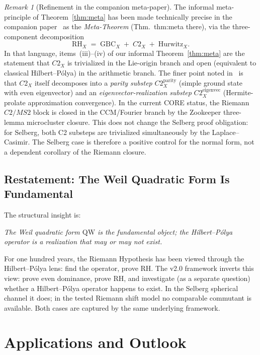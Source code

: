 \documentclass[12pt,a4paper]{article}
\theoremstyle{definition}
\theoremstyle{remark}
\newtheorem{remark}[theorem]{Remark}
\newcommand{\QW}{\mathrm{QW}}
\begin{document}
\begin{remark}[Refinement in the companion meta-paper]
\label{rem:meta-paper-refinement}
The informal meta-principle of Theorem~\ref{thm:meta} has been made
technically precise in the companion paper~\cite{GeigerMeta2026} as the
\emph{Meta-Theorem} (Thm.~thm:meta there), via the three-component
decomposition
\[
\mathrm{RH}_X \;=\; \mathrm{GBC}_X \;+\; C2_X \;+\; \mathrm{Hurwitz}_X.
\]
In that language, items~(iii)--(iv) of our informal Theorem~\ref{thm:meta}
are the statement that $C2_X$ is trivialized in the Lie-origin branch and
open (equivalent to classical Hilbert--Pólya) in the arithmetic branch.
The finer point noted in~\cite{GeigerMeta2026}
is that $C2_X$ itself decomposes into a \emph{parity substep}
$C2_X^{\mathrm{parity}}$ (simple ground state with even eigenvector) and an
\emph{eigenvector-realization substep} $C2_X^{\mathrm{eigenvec}}$
(Hermite-prolate approximation convergence). In the current CORE status,
the Riemann $C2/MS2$ block is closed in the CCM/Fourier branch by the
Zookeeper three-lemma microcluster closure.  This does not change the
Selberg proof obligation: for Selberg, both C2 substeps are trivialized
simultaneously by the Laplace--Casimir.  The Selberg case is therefore a
positive control for the normal form, not a dependent corollary of the
Riemann closure.
\end{remark}

\subsection{Restatement: The Weil Quadratic Form Is Fundamental}

The structural insight is:

\medskip
\noindent\emph{The Weil quadratic form $\QW$ is the fundamental object; the
Hilbert--Pólya operator is a realization that may or may not exist.}

\medskip
For one hundred years, the Riemann Hypothesis has been viewed through the
Hilbert--Pólya lens: find the operator, prove RH. The v2.0 framework
inverts this view: prove even dominance, prove RH, and investigate (as a
separate question) whether a Hilbert--Pólya operator happens to exist.
In the Selberg spherical channel it does; in the tested Riemann shift model no
comparable commutant is available. Both cases are captured by the same
underlying framework.


\section{Applications and Outlook}
\label{sec:applications}
\end{document}
